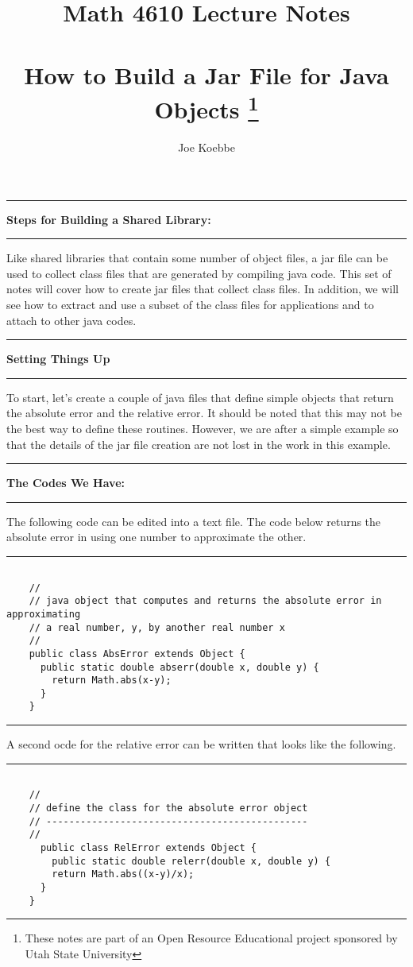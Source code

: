 \documentclass[10pt,fleqn]{article}
\title{Math 4610 Lecture Notes \\
            \ \\
            How to Build a Jar File for Java Objects
  \footnote{These notes are part of an Open Resource Educational project
            sponsored by Utah State University}}
\author{Joe Koebbe}
\begin{document}
\maketitle
\newpage
\vskip0.1in\hrule\vskip0.1in
\noindent
{\bf Steps for Building a Shared Library:}
\vskip0.1in\hrule\vskip0.1in
\noindent
Like shared libraries that contain some number of object files, a jar file can
be used to collect class files that are generated by compiling java code. This
set of notes will cover how to create jar files that collect class files. In
addition, we will see how to extract and use a subset of the class files for
applications and to attach to other java codes.
\vskip0.1in\hrule\vskip0.1in
{\large{\bf Setting Things Up}}
\vskip0.1in\hrule\vskip0.1in
\noindent
To start, let's create a couple of java files that define simple objects that
return the absolute error and the relative error. It should be noted that this
may not be the best way to define these routines. However, we are after a simple
example so that the details of the jar file creation are not lost in the work in
this example.
\vskip0.1in\hrule\vskip0.1in
{\large{\bf The Codes We Have:}}
\vskip0.1in\hrule\vskip0.1in
\noindent
The following code can be edited into a text file. The code below returns the
absolute error in using one number to approximate the other.
\vskip0.1in\hrule\vskip0.1in
\begin{verbatim}

    //
    // java object that computes and returns the absolute error in approximating
    // a real number, y, by another real number x
    //
    public class AbsError extends Object {
      public static double abserr(double x, double y) {
        return Math.abs(x-y);
      }
    }

\end{verbatim}
\vskip0.1in\hrule\vskip0.1in
\noindent
A second ocde for the relative error can be written that looks like the
following.
\vskip0.1in\hrule\vskip0.1in
\begin{verbatim}

    //
    // define the class for the absolute error object
    // ----------------------------------------------
    //
      public class RelError extends Object {
        public static double relerr(double x, double y) {
        return Math.abs((x-y)/x);
      }
    }

\end{verbatim}
\end{document}
